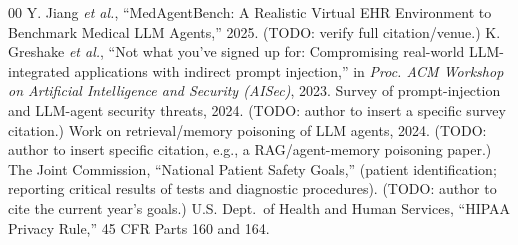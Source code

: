\documentclass[conference]{IEEEtran}
\begin{document}
\begin{thebibliography}{00}
 Y. Jiang \emph{et al.}, ``MedAgentBench: A Realistic Virtual EHR Environment to Benchmark Medical LLM Agents,'' 2025. (TODO: verify full citation/venue.)
 K. Greshake \emph{et al.}, ``Not what you've signed up for: Compromising real-world LLM-integrated applications with indirect prompt injection,'' in \emph{Proc. ACM Workshop on Artificial Intelligence and Security (AISec)}, 2023.
 Survey of prompt-injection and LLM-agent security threats, 2024. (TODO: author to insert a specific survey citation.)
 Work on retrieval/memory poisoning of LLM agents, 2024. (TODO: author to insert specific citation, e.g., a RAG/agent-memory poisoning paper.)
 The Joint Commission, ``National Patient Safety Goals,'' (patient identification; reporting critical results of tests and diagnostic procedures). (TODO: author to cite the current year's goals.)
 U.S. Dept.\ of Health and Human Services, ``HIPAA Privacy Rule,'' 45 CFR Parts 160 and 164.
\end{thebibliography}
\end{document}
